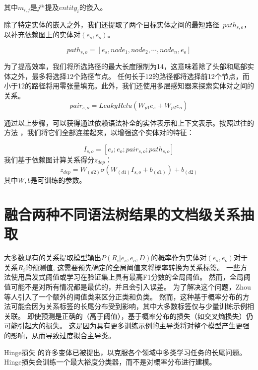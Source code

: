 \documentclass[bachelor]{thesis-uestc}
\begin{document}
其中$m_{i, j}$是$j^{th}$提及$entity_i$的嵌入。\par
除了特定实体的嵌入之外，我们还提取了两个目标实体之间的最短路径\ $path_{s, o}$，以补充依赖图上的实体对$(e_s,e_o)$。

\begin{equation}
    path_{s,o} = [ e_s, node_1, node_2, \cdots, node_n, e_o ]
\end{equation}

为了提高效率，我们将所选路径的最大长度限制为14，这意味着除了头部和尾部实体之外，最多将选择12个路径节点。
任何长于12的路径都将选择前12个节点，而小于12的路径将用零张量填充。此外，我们还使用多层感知器来探索实体对之间的关系。
\begin{equation}
    pair_{s,o} = LeakyRelu(W_{p1}e_s + W_{p2}e_o)
\end{equation}
\par

通过以上步骤，可以获得通过依赖语法补全的实体表示和上下文表示。按照过往的方法 \cite{mou-etal-2016-natural}，我们将它们全部连接起来，以增强这个实体对的特征：

\begin{equation}
    I_{s,o} = [e_s;e_o;pair_{s,o};path_{s,o}]
\end{equation}
我们基于依赖图计算关系得分$z_{dep}$：
\begin{equation}
    z_{dep} = W_{(d2)} \sigma (W_{(d1)}I_{s,o} + b_{(d1)}) + b_{(d2)}
\end{equation}
其中$W, b$是可训练的参数。\par

\section{融合两种不同语法树结果的文档级关系抽取}
大多数现有的关系提取模型输出$P(R_i|e_s, e_o, D)$的概率作为实体对$(e_s, e_o)$对于关系$R_i$的预测值, 这需要预先确定的全局阈值来将概率转换为关系标签。
一些方法使用启发式阈值或学习在验证集上具有最高F1分数的全局阈值。
然而，全局阈值可能不是对所有情况都是最优的，并且会引入误差。
为了解决这个问题，Zhou等人引入了一个额外的阈值类来区分正类和负类。
然而，这种基于概率分布的方法可能会因为关系标签的长尾分布受到影响，其中大多数标签仅与少量训练示例相关联。
即使预测是正确的（高于阈值），基于概率分布的损失（如交叉熵损失）仍可能引起大的损失。
这是因为具有更多训练示例的主导类将对整个模型产生更强的影响，从而导致过度拟合主导类。\par
Hinge损失 的许多变体已被提出，以克服各个领域中多类学习任务的长尾问题。
Hinge损失会训练一个最大裕度分类器，而不是对概率分布进行建模。
\par
\end{document}
